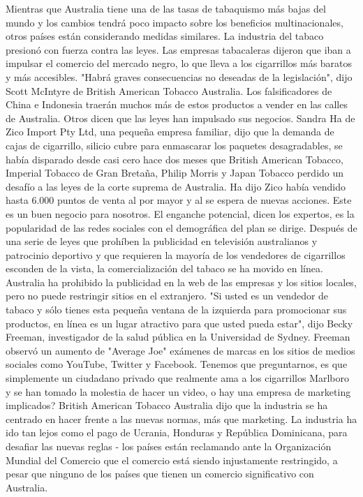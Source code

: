 Mientras que Australia tiene una de las tasas de tabaquismo más bajas del mundo y los cambios tendrá poco impacto sobre los beneficios multinacionales, otros países están considerando medidas similares.
La industria del tabaco presionó con fuerza contra las leyes.
Las empresas tabacaleras dijeron que iban a impulsar el comercio del mercado negro, lo que lleva a los cigarrillos más baratos y más accesibles.
"Habrá graves consecuencias no deseadas de la legislación", dijo Scott McIntyre de British American Tobacco Australia.
Los falsificadores de China e Indonesia traerán muchos más de estos productos a vender en las calles de Australia.
Otros dicen que las leyes han impulsado sus negocios.
Sandra Ha de Zico Import Pty Ltd, una pequeña empresa familiar, dijo que la demanda de cajas de cigarrillo, silicio cubre para enmascarar los paquetes desagradables, se había disparado desde casi cero hace dos meses que British American Tobacco, Imperial Tobacco de Gran Bretaña, Philip Morris y Japan Tobacco perdido un desafío a las leyes de la corte suprema de Australia.
Ha dijo Zico había vendido hasta 6.000 puntos de venta al por mayor y al se espera de nuevas acciones.
Este es un buen negocio para nosotros.
El enganche potencial, dicen los expertos, es la popularidad de las redes sociales con el demográfica del plan se dirige.
Después de una serie de leyes que prohíben la publicidad en televisión australianos y patrocinio deportivo y que requieren la mayoría de los vendedores de cigarrillos esconden de la vista, la comercialización del tabaco se ha movido en línea.
Australia ha prohibido la publicidad en la web de las empresas y los sitios locales, pero no puede restringir sitios en el extranjero.
"Si usted es un vendedor de tabaco y sólo tienes esta pequeña ventana de la izquierda para promocionar sus productos, en línea es un lugar atractivo para que usted pueda estar", dijo Becky Freeman, investigador de la salud pública en la Universidad de Sydney.
Freeman observó un aumento de "Average Joe" exámenes de marcas en los sitios de medios sociales como YouTube, Twitter y Facebook.
Tenemos que preguntarnos, es que simplemente un ciudadano privado que realmente ama a los cigarrillos Marlboro y se han tomado la molestia de hacer un video, o hay una empresa de marketing implicados?
British American Tobacco Australia dijo que la industria se ha centrado en hacer frente a las nuevas normas, más que marketing.
La industria ha ido tan lejos como el pago de Ucrania, Honduras y República Dominicana, para desafiar las nuevas reglas - los países están reclamando ante la Organización Mundial del Comercio que el comercio está siendo injustamente restringido, a pesar que ninguno de los países que tienen un comercio significativo con Australia.
